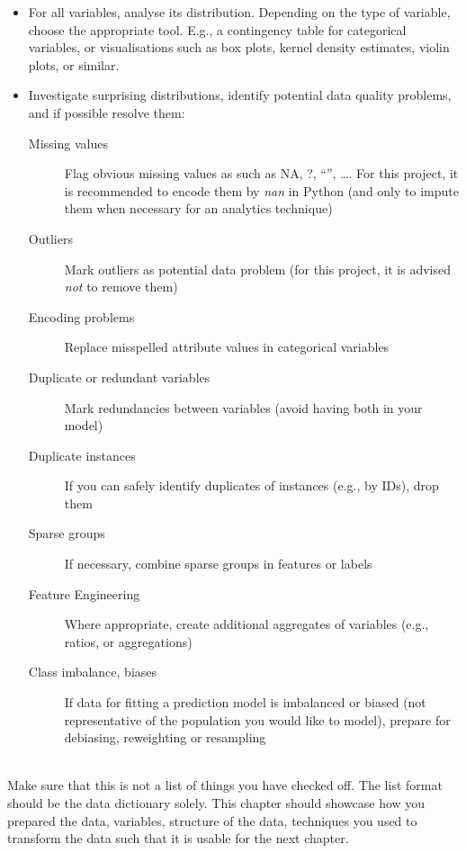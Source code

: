 \begin{itemize}
  \setlength\itemsep{0em}
  \item For all variables, analyse its distribution. Depending on the type of variable, choose the appropriate tool. E.g., a contingency table for categorical variables, or visualisations such as box plots, kernel density estimates, violin plots, or similar.
  \item Investigate surprising distributions, identify potential data quality problems, and if possible resolve them:
  \begin{description}
    \item[Missing values] Flag obvious missing values as such as NA, ?, ``'', \dots. For this project, it is recommended to encode them by \emph{nan} in Python (and only to impute them when necessary for an analytics technique)
    \item[Outliers] Mark outliers as potential data problem (for this project, it is advised \emph{not} to remove them)
    \item[Encoding problems] Replace misspelled attribute values in categorical variables
    \item[Duplicate or redundant variables] Mark redundancies between variables (avoid having both in your model)
    \item[Duplicate instances] If you can safely identify duplicates of instances (e.g., by IDs), drop them
    \item[Sparse groups] If necessary, combine sparse groups in features or labels
    \item[Feature Engineering] Where appropriate, create additional aggregates of variables (e.g., ratios, or aggregations)
    \item[Class imbalance, biases] If data for fitting a prediction model is imbalanced or biased (not representative of the population you would like to model), prepare for debiasing, reweighting or resampling
  \end{description}
\end{itemize}\\

Make sure that this is not a list of things you have checked off. The list format should be the data dictionary solely. This chapter should showcase how you prepared the data, variables, structure of the data, techniques you used to transform the data such that it is usable for the next chapter.

